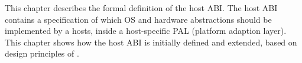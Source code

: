 This chapter describes the formal definition of the host ABI.
The host ABI contains a specification of which OS and hardware abstractions should be implemented by a hosts, %
inside a host-specific
PAL (platform adaption layer).
This chapter shows how the host ABI is initially defined and extended,
based on design principles of \graphene{}. %


















%
%
%










